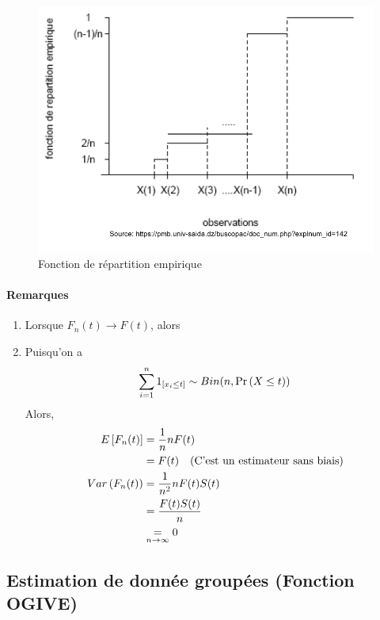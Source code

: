 \documentclass[12pt, french]{report}
\begin{document}
\begin{figure}[!h]
	\centering
	\includegraphics[scale=0.4]{Figures/Fct_repartition_empirique.png}
	\caption{Fonction de répartition empirique}
 \end{figure}

\paragraph{Remarques}
\begin{enumerate}[label=(\arabic*)]
\item Lorsque $F_n(t) \to F(t)$, alors

\item Puisqu'on a
\begin{align*}
\sum_{i=1}^{n} 1_{[x_i \leq t]} \sim Bin(n,\Pr \left( X \leq t \right))
\end{align*}
Alors,
\begin{align*}
E \left[ F_n(t) \right]		& = \frac{1}{n} n F(t) \\
	& = F(t) \quad \text{(C'est un estimateur sans biais)} \\
Var \left( F_n(t) \right) & = \frac{1}{n^2}  n F(t) S(t) \\
	& = \frac{F(t) S(t)}{n}	\\
	& \underset{n \to \infty}{=} 0 \\
\end{align*}
\end{enumerate}

\subsection{Estimation de donnée groupées (Fonction OGIVE)}
\end{document}
